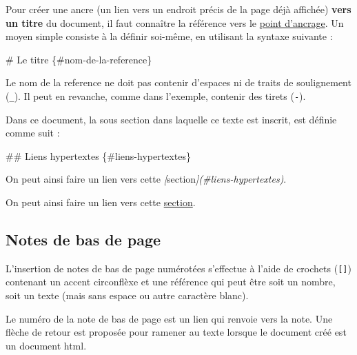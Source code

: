 \documentclass[
  11pt,
]{book}
\newenvironment{Shaded}{\begin{snugshade}}{\end{snugshade}}
\newcommand{\CommentTok}[1]{\textcolor[rgb]{0.56,0.35,0.01}{\textit{#1}}}
\newcommand{\FunctionTok}[1]{\textcolor[rgb]{0.00,0.00,0.00}{#1}}
\newcommand{\NormalTok}[1]{#1}
\newcommand{\OtherTok}[1]{\textcolor[rgb]{0.56,0.35,0.01}{#1}}
\numberwithin{equation}{section}
\numberwithin{countremarque}{section}
\begin{document}
Pour créer une ancre (un lien vers un endroit précis de la page déjà affichée) \textbf{vers un titre} du document, il faut connaître la référence vers le \protect\hyperlink{lien-ancre}{point d'ancrage}. Un moyen simple consiste à la définir soi-même, en utilisant la syntaxe suivante :

\begin{Shaded}
\begin{Highlighting}[]
\FunctionTok{\# Le titre \{\#nom{-}de{-}la{-}reference\}}
\end{Highlighting}
\end{Shaded}

Le nom de la reference ne doit pas contenir d'espaces ni de traits de soulignement (\texttt{\_}). Il peut en revanche, comme dans l'exemple, contenir des tirets (\texttt{-}).

Dans ce document, la sous section dans laquelle ce texte est inscrit, est définie comme suit :

\begin{Shaded}
\begin{Highlighting}[]
\FunctionTok{\#\# Liens hypertextes \{\#liens{-}hypertextes\}}
\end{Highlighting}
\end{Shaded}

\begin{Shaded}
\begin{Highlighting}[]
\NormalTok{On peut ainsi faire un lien vers cette }\CommentTok{[}\OtherTok{section}\CommentTok{](\#liens{-}hypertextes)}\NormalTok{.}
\end{Highlighting}
\end{Shaded}

On peut ainsi faire un lien vers cette \protect\hyperlink{liens-hypertextes}{section}.

\hypertarget{notes-de-bas-de-page}{%
\subsection{Notes de bas de page}\label{notes-de-bas-de-page}}

L'insertion de notes de bas de page numérotées s'effectue à l'aide de crochets (\texttt{{[}{]}}) contenant un accent circonflèxe et une référence qui peut être soit un nombre, soit un texte (mais sans espace ou autre caractère blanc).

Le numéro de la note de bas de page est un lien qui renvoie vers la note. Une flèche de retour est proposée pour ramener au texte lorsque le document créé est un document html.
\end{document}
